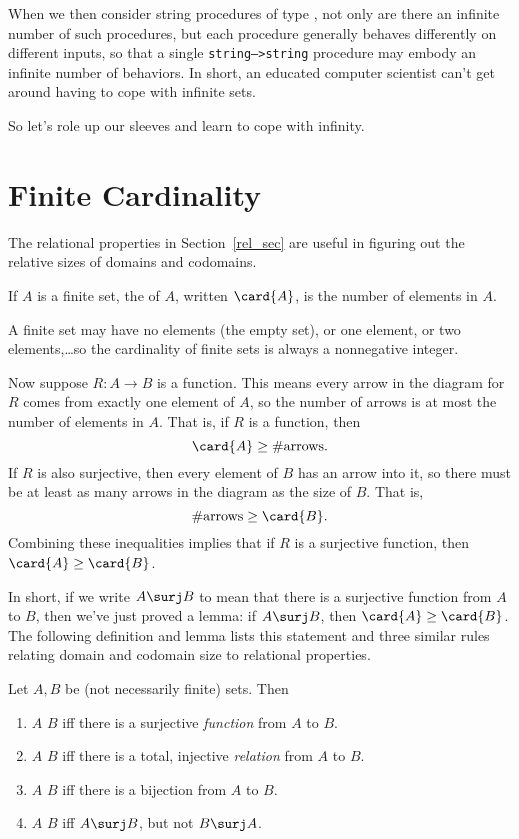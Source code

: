 When we then consider string procedures of
type , not only are there an infinite number
of such procedures, but each procedure generally behaves differently on
different inputs, so that a single \texttt{string-->string} procedure may
embody an infinite number of behaviors.  In short, an educated computer
scientist can't get around having to cope with infinite sets.
\fi

So let's role up our sleeves and learn to cope with infinity.

\section{Finite Cardinality}\label{mappingrule_sec}

The relational properties in Section~\ref{rel_sec} are useful in figuring
out the relative sizes of domains and codomains.
\begin{definition}\label{fin_card_def}
If $A$ is a finite set, the  of $A$, written $\card{A}$,
is the number of elements in $A$.
\end{definition}
A finite set may have no elements (the empty set), or one element, or two
elements,\dots so the cardinality of finite sets is always a nonnegative
integer.

Now suppose $R:A \to B$ is a function.  This means every arrow in the diagram
for $R$ comes from exactly one element of $A$, so the number of arrows is
at most the number of elements in $A$.  That is, if $R$ is a function,
then
\[
\card{A} \geq \#\text{arrows}.
\]
If $R$ is also surjective, then every element of $B$ has an arrow
into it, so there must be at least as many arrows in the diagram as the
size of $B$.  That is,
\[
\#\text{arrows} \geq \card{B}.
\]
Combining these inequalities implies that if $R$ is a surjective
function, then $\card{A} \geq \card{B}$.

In short, if we write $A \surj B$ to mean that there is a surjective
function from $A$ to $B$, then we've just proved a lemma: if $A \surj B$,
then $\card{A} \geq \card{B}$.  The following definition and lemma lists
this statement and three similar rules relating domain and codomain size
to relational properties.

\begin{definition}\label{bigger}
  Let $A,B$ be (not necessarily finite) sets.  Then
  \begin{enumerate}
  \item $A$ \term{$\surj$} $B$ iff there is a surjective \emph{function} from $A$ to $B$.  

  \item $A$ \term{$\inj$} $B$ iff there is a total, injective \emph{relation} from $A$ to $B$.

  \item $A$ \term{$\bij$} $B$ iff there is a bijection from $A$ to $B$.  

  \item $A$ \term{$\strict$} $B$ iff $A \surj B$, but not $B \surj A$.

  \end{enumerate}
\end{definition}

